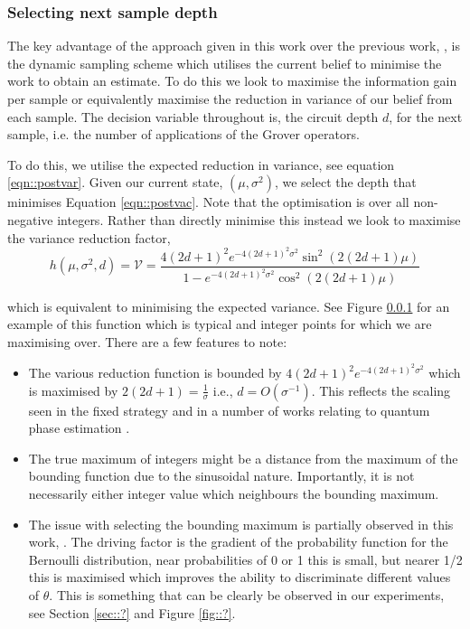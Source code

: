 \subsubsection{Selecting next sample depth}

The key advantage of the approach given in this work over the previous work, \cite{}, is the dynamic sampling scheme which utilises the current belief to minimise the work to obtain an estimate. To do this we look to maximise the information gain per sample or equivalently maximise the reduction in variance of our belief from each sample. The decision variable throughout is, the circuit depth $d$, for the next sample, i.e. the number of applications of the Grover operators.

To do this, we utilise the expected reduction in variance, see equation \ref{eqn::postvar}. Given our current state, $(\mu,\sigma^2)$, we select the depth that minimises Equation \ref{eqn::postvac}. Note that the optimisation is over all non-negative integers. Rather than directly minimise this instead we look to maximise the variance reduction factor,
\begin{equation}
h(\mu,\sigma^2,d) = \mathcal{V} = \frac{4 \left( 2d+1 \right) ^2 e^{ - 4\left( 2d+1 \right) ^2 \sigma^2} \sin^2\left( 2 \left( 2d+1 \right) \mu \right) }{1- e^{-4\left( 2d+1 \right) ^2\sigma^2}\cos^2\left( 2\left( 2d+1 \right) \mu \right) } \label{eqn::varfactor}
\end{equation}

which is equivalent to minimising the expected variance. See Figure \ref{} for an example of this function which is typical and integer points for which we are maximising over. There are a few features to note:
\begin{itemize}
	\item The various reduction function is bounded by $4\left( 2d+1 \right) ^2 e^{-4 \left( 2d+1 \right) ^2 \sigma^2}$ which is maximised by $2\left( 2d+1 \right)  = \frac{1}{\sigma} $ i.e., $d = O\left( \sigma^{-1} \right) $. This reflects the scaling seen in the fixed strategy and in a number of works relating to quantum phase estimation \cite{}.
	\item The true maximum of integers might be a distance from the maximum of the bounding function due to the sinusoidal nature. Importantly, it is not necessarily either integer value which neighbours the bounding maximum.
	\item The issue with selecting the bounding maximum is partially observed in this work, \cite{}. The driving factor is the gradient of the probability function for the Bernoulli distribution, near probabilities of 0 or 1 this is small, but nearer 1/2 this is maximised which improves the ability to discriminate different values of $\theta$. This is something that can be clearly be observed in our experiments, see Section \ref{sec::?} and Figure \ref{fig::?}.
\end{itemize}

